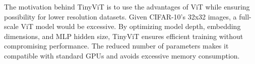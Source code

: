 The motivation behind TinyViT is to use the advantages of ViT while ensuring possibility for lower resolution datasets. Given CIFAR-10’s 32x32 images, a full-scale ViT model would be excessive. By optimizing model depth, embedding dimensions, and MLP hidden size, TinyViT ensures efficient training without compromising performance. The reduced number of parameters makes it compatible with standard GPUs and avoids excessive memory consumption.

\raggedbottom